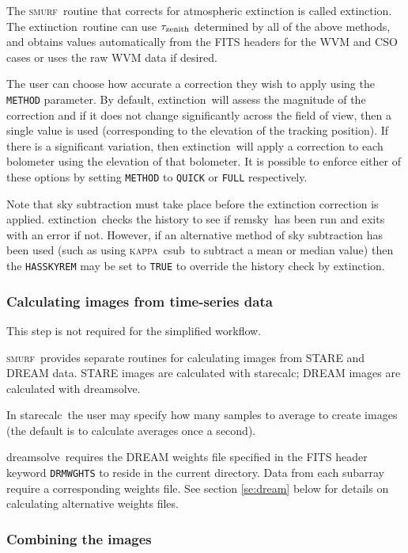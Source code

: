 \documentclass[twoside,11pt]{article}
\newcommand{\xref}[3]{#1}
\newcommand{\xlabel}[1]{}
\renewcommand{\_}{\texttt{\symbol{95}}}
\newcommand{\KAPPA}{\textsc{kappa}}
\newcommand{\SMURF}{\textsc{smurf}}
\newcommand{\task}[1]{\textsf{#1}}
\newcommand{\dreamsolve}{\xref{\task{dreamsolve}}{sun258}{DREAMSOLVE}}
\newcommand{\starecalc}{\xref{\task{starecalc}}{sun258}{STARECALC}}
\newcommand{\extinction}{\xref{\task{extinction}}{sun258}{EXTINCTION}}
\newcommand{\remsky}{\xref{\task{remsky}}{sun258}{REMSKY}}
\newcommand{\csub}{\xref{\task{csub}}{sun95}{CSUB}}
\newcommand{\aparam}[1]{\texttt{#1}}     %
\begin{document}
The \SMURF\ routine that corrects for atmospheric extinction is called
\extinction. The \extinction\ routine can use $\tau_{\rm zenith}$
determined by all of the above methods, and obtains values
automatically from the FITS headers for the WVM and CSO cases or uses
the raw WVM data if desired.

The user can choose how accurate a correction they wish to apply using
the \aparam{METHOD} parameter. By default, \extinction\ will assess
the magnitude of the correction and if it does not change
significantly across the field of view, then a single value is used
(corresponding to the elevation of the tracking position). If there is
a significant variation, then \extinction\ will apply a correction to
each bolometer using the elevation of that bolometer. It is possible
to enforce either of these options by setting \aparam{METHOD} to
\texttt{QUICK} or \texttt{FULL} respectively.

Note that sky subtraction must take place before the extinction
correction is applied. \extinction\ checks the history to see if
\remsky\ has been run and exits with an error if not. However, if an
alternative method of sky subtraction has been used (such as using
\KAPPA\ \csub\ to subtract a mean or median value) then the
\aparam{HASSKYREM} may be set to \texttt{TRUE} to override the history
check by \extinction.

\subsubsection{\xlabel{dsimages}Calculating images from time-series
  data\label{se:dsimages}}

This step is not required for the simplified workflow.

\SMURF\ provides separate routines for calculating images from STARE
and DREAM data. STARE images are calculated with \starecalc; DREAM
images are calculated with \dreamsolve.

In \starecalc\ the user may specify how many samples to average to
create images (the default is to calculate averages once a second).

\dreamsolve\ requires the DREAM weights file specified in the FITS
header keyword \texttt{DRMWGHTS} to reside in the current
directory. Data from each subarray require a corresponding weights
file. See section \ref{se:dream} below for details on calculating
alternative weights files.

\subsubsection{\xlabel{mosaic}Combining the images\label{se:mosaic}}
\end{document}
